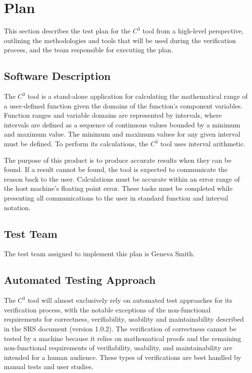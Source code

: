 \documentclass[12pt, titlepage]{article}
\newcommand{\prognameAbbrv}{$C^{3}$}
\newcommand{\srsVersion}{1.0.2}
\begin{document}
\section{Plan}
\label{testplan_highlevel}
This section describes the test plan for the \prognameAbbrv{} tool from a 
high-level perspective, outlining the methodologies and tools that will be used 
during the verification process, and the team responsible for executing the 
plan.
	
\subsection{Software Description}
The \prognameAbbrv{} tool is a stand-alone application for calculating 
the mathematical range of a user-defined function given the domains of the 
function's component variables. Function ranges and variable domains are 
represented by intervals, where intervals are defined as a sequence of 
continuous values bounded by a minimum and maximum value. The minimum and 
maximum values for any given interval must be defined. To perform its 
calculations, the \prognameAbbrv{} tool uses interval arithmetic.

The purpose of this product is to produce accurate results when they can be 
found. If a result cannot be found, the tool is expected to communicate the 
reason back to the user. Calculations must be accurate within an error range of 
the host machine's floating point error. These tasks must be completed while 
presenting all communications to the user in standard function and interval 
notation.

\subsection{Test Team}

The test team assigned to implement this plan is Geneva Smith.

\subsection{Automated Testing Approach}
The \prognameAbbrv{} tool will almost exclusively rely on automated test 
approaches for its verification process, with the notable exceptions of the 
non-functional requirements for correctness, verifiability, usability and 
maintainability described in the SRS document (version \srsVersion{}). The 
verification of correctness cannot be tested by a machine because it relies on 
mathematical proofs and the remaining non-functional requirements of 
verifiability, usability, and maintainability are intended for a 
human audience. These types of verifications are best handled by manual tests 
and user studies.
\end{document}
